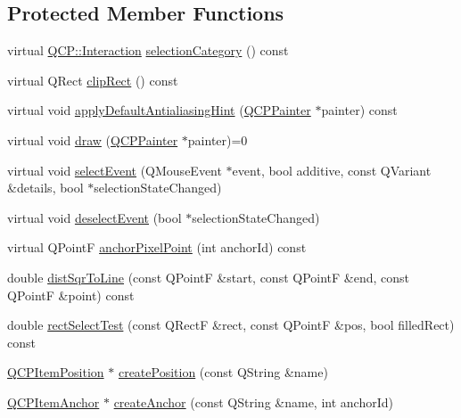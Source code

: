 \subsection*{Protected Member Functions}
\begin{DoxyCompactItemize}
\item 
virtual \hyperlink{namespace_q_c_p_a2ad6bb6281c7c2d593d4277b44c2b037}{Q\+C\+P\+::\+Interaction} \hyperlink{class_q_c_p_abstract_item_a777b5d384936396ad9c3ceb3d3453f1c}{selection\+Category} () const 
\item 
virtual Q\+Rect \hyperlink{class_q_c_p_abstract_item_a538e25ff8856534582f5b2b400a46405}{clip\+Rect} () const 
\item 
virtual void \hyperlink{class_q_c_p_abstract_item_a0839031abdd71067e2256a4d53c7a011}{apply\+Default\+Antialiasing\+Hint} (\hyperlink{class_q_c_p_painter}{Q\+C\+P\+Painter} $\ast$painter) const 
\item 
virtual void \hyperlink{class_q_c_p_abstract_item_ad0dc056f650c3ca73414e6b4f01674ef}{draw} (\hyperlink{class_q_c_p_painter}{Q\+C\+P\+Painter} $\ast$painter)=0
\item 
virtual void \hyperlink{class_q_c_p_abstract_item_aaf92af7b9893712959a6c073d334d88d}{select\+Event} (Q\+Mouse\+Event $\ast$event, bool additive, const Q\+Variant \&details, bool $\ast$selection\+State\+Changed)
\item 
virtual void \hyperlink{class_q_c_p_abstract_item_a91f090d6763cfedb0749219c63788ae9}{deselect\+Event} (bool $\ast$selection\+State\+Changed)
\item 
virtual Q\+Point\+F \hyperlink{class_q_c_p_abstract_item_a94bde62b8a2fc133666dcbb8035deeed}{anchor\+Pixel\+Point} (int anchor\+Id) const 
\item 
double \hyperlink{class_q_c_p_abstract_item_acdca343717d625b8abb3c3e38c0ed39d}{dist\+Sqr\+To\+Line} (const Q\+Point\+F \&start, const Q\+Point\+F \&end, const Q\+Point\+F \&point) const 
\item 
double \hyperlink{class_q_c_p_abstract_item_a4c0e14c4e92df91174cb7183fb363069}{rect\+Select\+Test} (const Q\+Rect\+F \&rect, const Q\+Point\+F \&pos, bool filled\+Rect) const 
\item 
\hyperlink{class_q_c_p_item_position}{Q\+C\+P\+Item\+Position} $\ast$ \hyperlink{class_q_c_p_abstract_item_a75036d39c4d4e2e1a7dd145fff915d32}{create\+Position} (const Q\+String \&name)
\item 
\hyperlink{class_q_c_p_item_anchor}{Q\+C\+P\+Item\+Anchor} $\ast$ \hyperlink{class_q_c_p_abstract_item_af3fc92527802078ca395138748b629a7}{create\+Anchor} (const Q\+String \&name, int anchor\+Id)
\end{DoxyCompactItemize}
